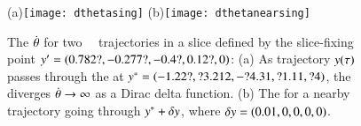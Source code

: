 


 \begin{figure}
 \begin{center}
(a)\texttt{[image: dthetasing]}%
(b)\texttt{[image: dthetanearsing]}%
 \end{center}
 \caption{\label{fig:dthetasing}
The {\groupVel} $\dot{{\bf \theta}}$ for two \cLf\
\reducedsp\ trajectories in a slice defined by the slice-fixing
point ${y'}=(0.782?,-0.277?,-0.4?,0.12?,0)$:
 (a) As trajectory $y(\tau)$ passes through the
{\sset} 
 at $y^*=(-1.22?, ?3.212, -?4.31, ?1.11, ?4)$,
the {\groupVel} diverges
$\dot{{\bf \theta}} \to \infty$ as a Dirac delta function.
(b) The {\groupVel} for a nearby trajectory going
through $y^*+\delta y$,
where $\delta y=(0.01,0,0,0,0)$.
 }%
 \end{figure}

